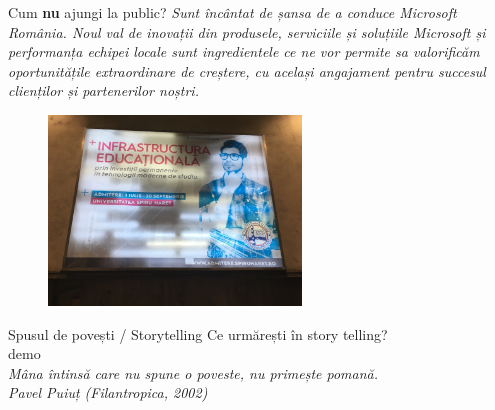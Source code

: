 \documentclass{simple}
\begin{document}
\begin{frame}{Cum \textbf{nu} ajungi la public?}
  \centering
  \pause
  \textit{Sunt încântat de șansa de a conduce Microsoft România. Noul val de inovații din produsele, serviciile și soluțiile Microsoft și performanța echipei locale sunt ingredientele ce ne vor permite sa valorificăm oportunitățile extraordinare de creștere, cu același angajament pentru succesul clienților și partenerilor noștri.}\\
  \pause
  \begin{figure}
    \includegraphics[width=0.6\textwidth]{img/promovare-spiru-haret}
  \end{figure}
\end{frame}

\begin{frame}{Spusul de povești / Storytelling}
  \centering
  \pause
  Ce urmărești în story telling?\\
  \pause
  \vspace{3mm}
  demo\\
  \pause
  \vspace{3mm}
  \textit{Mâna întinsă care nu spune o poveste, nu primește pomană.}\\
  \vspace{3mm}
  \hfill \textit{Pavel Puiuț (Filantropica, 2002)}
\end{frame}
\end{document}
